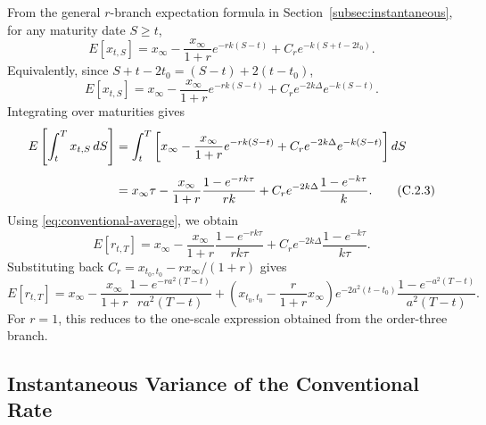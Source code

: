 \documentclass[12pt]{article}
\theoremstyle{statementstyle}
\begin{document}
\begin{appendices}
From the general $r$-branch expectation formula in
Section~\ref{subsec:instantaneous}, for any maturity date $S\ge t$,
\begin{equation}
E[x_{t,S}]
=
x_{\infty}
-
\frac{x_{\infty}}{1+r}e^{-rk(S-t)}
+
C_{r}e^{-k(S+t-2t_{0})}.
\tag{C.2.1}\label{eq:expected-irfr-general-r-C}
\end{equation}
Equivalently, since $S+t-2t_{0}=(S-t)+2(t-t_{0})$,
\begin{equation}
E[x_{t,S}]
=
x_{\infty}
-
\frac{x_{\infty}}{1+r}e^{-rk(S-t)}
+
C_{r}e^{-2k\Delta}e^{-k(S-t)}.
\tag{C.2.2}\label{eq:expected-irfr-general-r-C-shifted}
\end{equation}
Integrating over maturities gives
\begin{align}
E\left[\int_t^T x_{t,S}\,dS\right]
&=
\int_t^T
\left[
 x_{\infty}
 -\frac{x_{\infty}}{1+r}e^{-rk(S-t)}
 +C_{r}e^{-2k\Delta}e^{-k(S-t)}
\right]dS
\notag\\[0.4em]
&=
x_{\infty}\tau
-
\frac{x_{\infty}}{1+r}
\frac{1-e^{-rk\tau}}{rk}
+
C_{r}e^{-2k\Delta}
\frac{1-e^{-k\tau}}{k}.
\tag{C.2.3}\label{eq:integrated-expected-irfr-general-r}
\end{align}
Using \eqref{eq:conventional-average}, we obtain
\begin{equation}
E[r_{t,T}]
=
x_{\infty}
-
\frac{x_{\infty}}{1+r}
\frac{1-e^{-rk\tau}}{rk\tau}
+
C_{r}e^{-2k\Delta}
\frac{1-e^{-k\tau}}{k\tau}.
\tag{C.2.4}\label{eq:expected-conventional-general-r}
\end{equation}
Substituting back $C_{r}=x_{t_{0},t_{0}}-r x_{\infty}/(1+r)$ gives
\begin{equation}
E[r_{t,T}]
=
x_{\infty}
-
\frac{x_{\infty}}{1+r}
\frac{1-e^{-ra^{2}(T-t)}}{ra^{2}(T-t)}
+
\left(x_{t_{0},t_{0}}-\frac{r}{1+r}x_{\infty}\right)
e^{-2a^{2}(t-t_{0})}
\frac{1-e^{-a^{2}(T-t)}}{a^{2}(T-t)}.
\tag{C.2.5}\label{eq:expected-conventional-general-r-expanded}
\end{equation}
For $r=1$, this reduces to the one-scale expression obtained from the
order-three branch.

\subsection{Instantaneous Variance of the Conventional Rate}
\label{appendix:C2}


\end{appendices}
\end{document}

